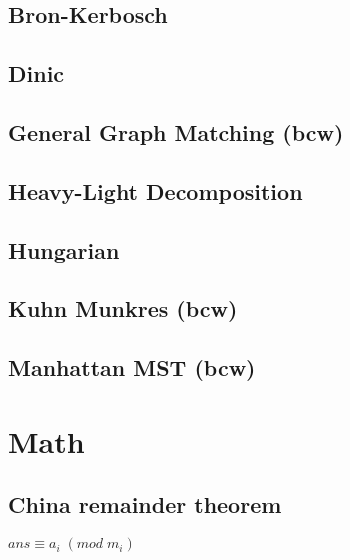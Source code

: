 \documentclass[11pt,twocolumn,a4paper]{article}
\begin{document}
\subsection{Bron-Kerbosch}


\subsection{Dinic}


\subsection{General Graph Matching (bcw)}


\subsection{Heavy-Light Decomposition}


\subsection{Hungarian}


\subsection{Kuhn Munkres (bcw)}


\subsection{Manhattan MST (bcw)}



\newpage
\section{Math}
\subsection{China remainder theorem}
$ ans \equiv  a_i\; (mod\; m_i) $

\end{document}
